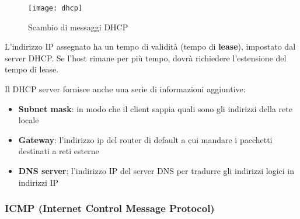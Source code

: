 \documentclass[a4paper]{article}
\begin{document}
\begin{figure}[H]
  \centering
  \texttt{[image: dhcp]}
  \caption{Scambio di messaggi DHCP}
\end{figure}

\noindent
L'indirizzo IP assegnato ha un tempo di validità (tempo di \textbf{lease}), impostato 
dal server DHCP. Se l'host rimane per più tempo, dovrà richiedere l'estensione del
tempo di lease.

\vspace{1em}
\noindent
Il DHCP server fornisce anche una serie di informazioni aggiuntive:
\begin{itemize}
  \item \textbf{Subnet mask}: in modo che il client sappia quali sono gli indirizzi
    della rete locale
  \item \textbf{Gateway}: l'indirizzo ip del router di default a cui mandare i pacchetti
    destinati a reti esterne
  \item \textbf{DNS server}: l'indirizzo IP del server DNS per tradurre gli indirizzi
    logici in indirizzi IP
\end{itemize}

\subsubsection{ICMP (Internet Control Message Protocol)}
\end{document}
